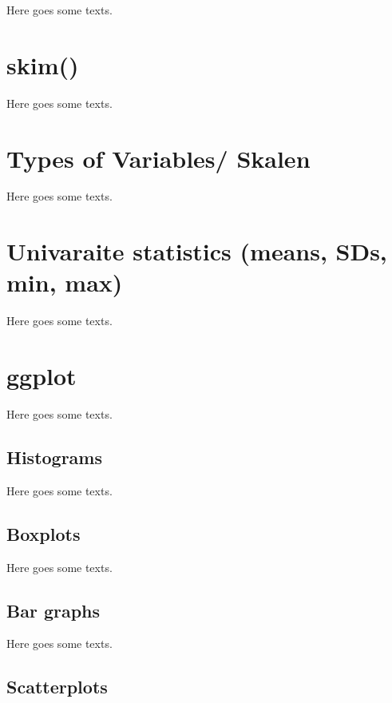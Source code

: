 \documentclass[
]{book}
\begin{document}
Here goes some texts.

\hypertarget{skim}{%
\section{skim()}\label{skim}}

Here goes some texts.

\hypertarget{types-of-variables-skalen}{%
\section{Types of Variables/ Skalen}\label{types-of-variables-skalen}}

Here goes some texts.

\hypertarget{univaraite-statistics-means-sds-min-max}{%
\section{Univaraite statistics (means, SDs, min, max)}\label{univaraite-statistics-means-sds-min-max}}

Here goes some texts.

\hypertarget{ggplot}{%
\section{ggplot}\label{ggplot}}

Here goes some texts.

\hypertarget{histograms}{%
\subsection{Histograms}\label{histograms}}

Here goes some texts.

\hypertarget{boxplots}{%
\subsection{Boxplots}\label{boxplots}}

Here goes some texts.

\hypertarget{bar-graphs}{%
\subsection{Bar graphs}\label{bar-graphs}}

Here goes some texts.

\hypertarget{scatterplots}{%
\subsection{Scatterplots}\label{scatterplots}}
\end{document}
